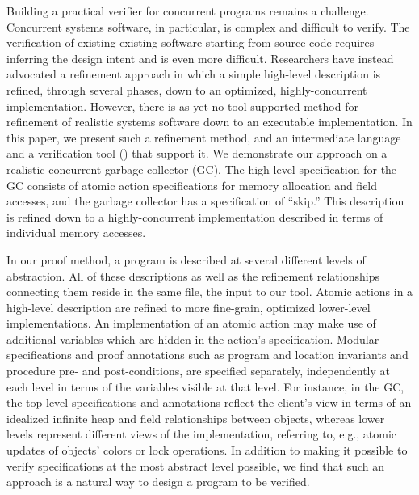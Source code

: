 Building a practical verifier for concurrent programs remains a challenge. 
Concurrent systems software, in particular, is complex and difficult to verify. 
The verification of existing existing software starting from source code requires inferring the design intent and is even more difficult. 
Researchers have instead advocated a refinement approach in which a simple high-level description is refined, through several phases, down to an optimized, highly-concurrent implementation.  However, there is as yet no tool-supported method for refinement of realistic systems software down to an executable implementation.  In this paper, we present such a refinement method, and an intermediate language  and a verification tool (\civl) that support it.  We demonstrate our approach on a realistic concurrent garbage collector (GC). The high level specification for the GC consists of atomic action specifications for memory allocation and field accesses, and the garbage collector has a specification of ``skip.'' This description is refined down to a highly-concurrent implementation described in terms of individual memory accesses.

In our proof method, a program is described at several different levels of abstraction. 
All of these descriptions as well as the refinement relationships connecting them reside in the same \civl file, the input to our tool. 
Atomic actions in a high-level description are refined to more fine-grain, optimized lower-level implementations. An implementation of an atomic action may make use of additional variables which are hidden in the action's specification. 
Modular specifications and proof annotations such as program and location invariants and procedure pre- and post-conditions, are specified separately, independently at each level in terms of the variables visible at that level. For instance, in the GC, the top-level specifications and annotations reflect the client's view in terms of an idealized infinite heap and field relationships between objects, 
 whereas lower levels represent different views of the implementation, referring to, e.g., atomic updates of objects' colors or lock operations.
In addition to making it possible to verify specifications at the most abstract level possible, we find that such an approach is a natural way to design a program to be verified.  


